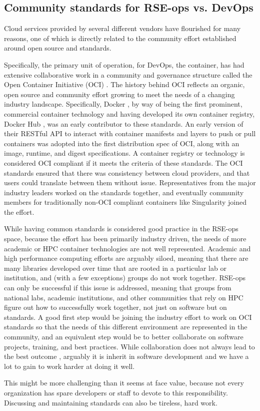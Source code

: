 \subsection{Community standards for RSE-ops vs. DevOps}

Cloud services provided by several different vendors have flourished for many reasons, one of which is directly related to the community effort established around open source and standards.

Specifically, the primary unit of operation, for DevOps, the container, has had extensive collaborative work in a community and governance structure called the Open Container Initiative (OCI) \cite{oci}. The history behind
OCI reflects an organic, open source and community effort growing to meet the needs of a changing industry landscape. Specifically, Docker \cite{docker}, by way of being the first prominent,
commercial container technology and having developed its own container registry, Docker Hub \cite{docker-hub}, was an early contributor to these standards. An early version of their RESTful API to interact with container manifests and layers to push or pull containers was adopted into the first distribution spec of OCI, along with an image, runtime, and digest specifications. A container registry or technology is considered OCI compliant if it meets the criteria of these standards. The OCI standards ensured that there was consistency between cloud providers, and that users could translate between them without issue. Representatives from the major industry leaders worked on the standards together, and eventually community members for traditionally non-OCI compliant containers like Singularity joined the effort. 

While having common standards is considered good practice in the RSE-ops space, because the effort has been primarily industry driven, the needs of more academic or HPC container technologies are not well represented. Academic and high performance computing efforts are arguably siloed, meaning that there are many libraries developed over time that are rooted in a particular lab or institution, and (with a few exceptions) groups do not work together. RSE-ops can only be successful if this issue is addressed, meaning that groups from national labs, academic institutions, and other communities
that rely on HPC figure out how to successfully work together, not just on software but on standards. A good first step would be joining the industry effort to work on OCI standards so that the needs of this different environment are represented in the community, and an equivalent step would be to better collaborate on software projects, training, and best practices. While collaboration does not always lead to the best outcome \cite{Wikipedia_contributors2021-wi}, arguably it is inherit in software development \cite{Whitehead2010-zg} and we have a lot to gain to work harder at doing it well.

This might be more challenging than it seems at face value, because not every organization has spare developers or staff to devote to this responsibility. Discussing and maintaining standards can also be tireless, hard work.
